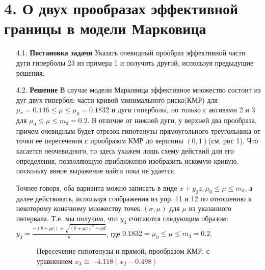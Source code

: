 \documentclass[12pt,a4 paper]{book}
\begin{document}
\section*{4. О двух прообразах эффективной границы в модели Марковица}
\smallskip
\begin{enumerate}
\item[4.1.]\textbf{Постановка задачи}
Указать очевидный прообраз эффективной части дуги гиперболы 23 из
примера 1 и получить другой, используя предыдущие решения.
\item[4.2.]\textbf{Решение}
В случае модели Марковица эффективное множество состоит из дуг двух гипербол: части кривой минимального риска(КМР) для $\mu_{*}=0.146 \leq \mu \leq \mu_{0}=0.1832$ и дуги гиперболы, но только с активами 2 и 3 для $\mu_{0} \leq \mu \leq m_{3}=0.2$. В отличие от нижней дуги, у верхней два прообраза, причем очевидным будет отрезок гипотенузы прямоугольного треугольника от точки ее пересечения с прообразом КМР до вершины $(0,1)$(см. рис 1). Что касается неочевидного, то здесь укажем лишь схему действий для его определения, позволяющую приближенно изобразить искомую кривую, поскольку явное выражение найти пока не удается.

Точнее говоря, оба варианта можно записать в виде $x+y_{3} z, \mu_{0} \leq \mu \leq m_{3}$, а далее действовать, используя соображения из упр. 11 и 12 по отношению к некоторому конечному множеству точек $(\sigma, \mu)$ для $\mu$ из указанного интервала. Т.е. мы получим, что $y_{3}$ считаются следующим образом: $y_{3}=\frac{-(b+\mu c) \pm \sqrt{(b+\mu c)^{2}+a d}}{a}$, где $0.1832=\mu_{0} \leq \mu \leq m_{3}=0.2$.

\begin{figure}[h]
\caption{Пересечение гипотенузы и прямой, прообразом КМР, с уравнением $x_{3} \cong-4.118\left(x_{2}-0.498\right)$}
\end{figure}
\end{enumerate}
\end{document}
